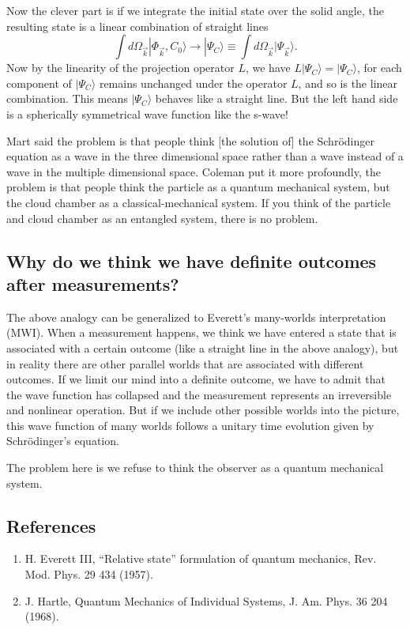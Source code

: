 \documentclass{article}
\begin{document}
Now the clever part is if we integrate the initial state over the solid angle, the resulting state is a linear combination of straight lines
$$
\int d\Omega_{\vec k} | \Phi_{\vec k}, C_0 \rangle
\rightarrow
|\Psi_C\rangle \equiv \int d\Omega_{\vec k} | \Psi_{\vec k} \rangle.
$$
Now by the linearity of the projection operator $L$, we have $L |\Psi_C\rangle = |\Psi_C\rangle$, for each component of $|\Psi_C\rangle$ remains unchanged under the operator $L$, and so is the linear combination. This means $|\Psi_C\rangle$ behaves like a straight line.  But the left hand side is a spherically symmetrical wave function like the s-wave!

Mart said the problem is that people think [the solution of] the Schr\"odinger equation as a wave in the three dimensional space rather than a wave instead of a wave in the multiple dimensional space.  Coleman put it more profoundly, the problem is that people think the particle as a quantum mechanical system, but the cloud chamber as a classical-mechanical system.  If you think of the particle and cloud chamber as an entangled system, there is no problem.

\subsection{Why do we think we have definite outcomes after measurements?}

The above analogy can be generalized to Everett's many-worlds interpretation (MWI).
When a measurement happens, we think we have entered a state
that is associated with a certain outcome (like a straight line in the above analogy),
but in reality there are other parallel worlds
that are associated with different outcomes.
If we limit our mind into a definite outcome,
we have to admit that the wave function has collapsed
and the measurement represents an irreversible and nonlinear operation.
But if we include other possible worlds into the picture,
this wave function of many worlds follows
a unitary time evolution given by Schr\"odinger's equation.

The problem here is we refuse to think the observer as a quantum mechanical system.

\subsection{References}
\begin{enumerate}
\item H. Everett III, ``Relative state'' formulation of quantum mechanics, Rev. Mod. Phys. 29 434 (1957).
\item J. Hartle, Quantum Mechanics of Individual Systems, J. Am. Phys. 36 204 (1968).
\end{enumerate}
\end{document}
